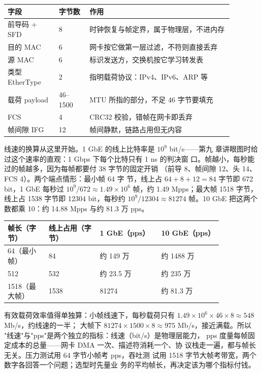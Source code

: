 \begin{longtable}{L{0.20\linewidth}L{0.12\linewidth}L{0.56\linewidth}}
\toprule
字段 & 字节数 & 作用 \\
\midrule
前导码 + SFD & 8 & 时钟恢复与帧定界，属于物理层，不进内存 \\
目的 MAC & 6 & 网卡按它做第一层过滤，不符则直接丢弃 \\
源 MAC & 6 & 标识发送方，交换机按它学习转发表 \\
类型 EtherType & 2 & 指明载荷协议：IPv4、IPv6、ARP 等 \\
载荷 payload & 46--1500 & MTU 所指的部分，不足 46 字节要填充 \\
FCS & 4 & CRC32 校验，错帧在网卡即丢弃 \\
帧间隙 IFG & 12 & 帧间静默，链路占用但无内容 \\
\bottomrule
\end{longtable}

线速的换算从这里开始。1 GbE 的线上比特率是 $10^{9}$ bit/s——第九
章讲眼图时给过这个速率的直观：1 Gbps 下每个比特只有 1 ns 的判决窗
口。帧越小，每秒能过的帧越多，因为每帧都要付 38 字节的固定开销
（前导 8、帧间隙 12、头 14、FCS 4）。两个端点情形：最小帧 64 字
节，线上占 $64+8+12=84$ 字节即 672 bit，1 GbE 每秒过
$10^{9}/672\approx1.49\times10^{6}$ 帧，约 1.49 Mpps；最大帧 1518
字节，线上占 1538 字节即 12304 bit，每秒约
$10^{9}/12304\approx81274$ 帧。10 GbE 把这两个数都乘 10：约 14.88
Mpps 与约 81.3 万 pps。

\begin{longtable}{L{0.16\linewidth}L{0.20\linewidth}L{0.24\linewidth}L{0.24\linewidth}}
\toprule
帧长（字节） & 线上占用（字节） & 1 GbE（pps） & 10 GbE（pps） \\
（最小帧） & 84 & 约 149 万 & 约 1488 万 \\
512 & 532 & 约 23.5 万 & 约 235 万 \\
1518（最大帧） & 1538 & 81274 & 约 81.3 万 \\
\bottomrule
\end{longtable}

有效载荷效率值得单独算：小帧线速下，每秒载荷只有
$1.49\times10^{6}\times46\times8\approx548$ Mb/s，约线速的一半；
大帧下 $81274\times1500\times8\approx975$ Mb/s，接近满载。所以
"线速"与"pps"是两个独立的指标：线速（bit/s）是物理层能力，
pps 度量每帧固定成本的总量——网卡 DMA 一次、描述符消耗一个、协
议栈走一遍，都与帧长无关。压力测试用 64 字节小帧考 pps，吞吐测
试用 1518 字节大帧考带宽，两个数字各回答一个问题；选型时先量业
务的平均帧长，再决定该为哪个指标付钱。

